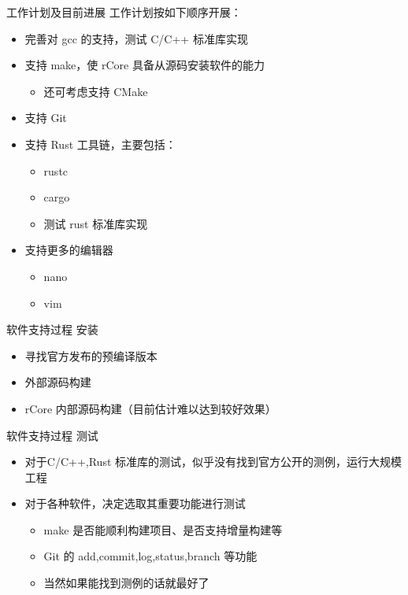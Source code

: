 \documentclass{beamer}
\begin{document}
\begin{frame}{工作计划及目前进展}
    工作计划按如下顺序开展：

    \begin{itemize}
        \setlength{\itemsep}{10pt}
        \item 完善对 gcc 的支持，测试 C/C++ 标准库实现
        \item 支持 make，使 rCore 具备从源码安装软件的能力
            \begin{itemize}
                \item 还可考虑支持 CMake
            \end{itemize}
        \item 支持 Git
        \item 支持 Rust 工具链，主要包括：
        \begin{itemize}
            \item rustc
            \item cargo
            \item 测试 rust 标准库实现
        \end{itemize}
        \item 支持更多的编辑器
        \begin{itemize}
            \item nano
            \item vim
        \end{itemize}
    \end{itemize}
\end{frame}

\begin{frame}{软件支持过程}
    {安装}
    \begin{itemize}
        \setlength{\itemsep}{10pt}
        \item 寻找官方发布的预编译版本
        \item 外部源码构建
        \item rCore 内部源码构建（目前估计难以达到较好效果）
    \end{itemize}
\end{frame}

\begin{frame}{软件支持过程}
    {测试}
    \begin{itemize}
        \setlength{\itemsep}{10pt}
        \item 对于C/C++,Rust 标准库的测试，似乎没有找到官方公开的测例，运行大规模工程
        \item 对于各种软件，决定选取其重要功能进行测试
        \begin{itemize}
            \setlength{\itemsep}{10pt}
            \item make 是否能顺利构建项目、是否支持增量构建等
            \item Git 的 add,commit,log,status,branch 等功能
            \item 当然如果能找到测例的话就最好了
        \end{itemize}
    \end{itemize}
\end{frame}
\end{document}
